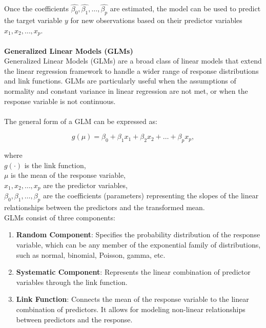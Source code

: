 \documentclass[12pt]{article}
\begin{document}
\noindent Once the coefficients \(\hat{\beta_0}, \hat{\beta_1}, \ldots, \hat{\beta_p}\) are estimated,
the model can be used to predict the target variable \(y\) for new observations based on
their predictor variables \(x_1, x_2, \ldots, x_p\).\\
\\
\textbf{Generalized Linear Models (GLMs)}\\
Generalized Linear Models (GLMs) are a broad class of linear models that extend the linear
regression framework to handle a wider range of response distributions and link functions.
GLMs are particularly useful when the assumptions of normality and constant variance in
linear regression are not met, or when the response variable is not continuous.\\
\\
The general form of a GLM can be expressed as:

\begin{equation}
    g(\mu) = \beta_0 + \beta_1 x_1 + \beta_2 x_2 + \ldots + \beta_p x_p,
\end{equation}

\noindent where\\
\( g(\cdot) \) is the link function,\\
\( \mu \) is the mean of the response variable,\\
\( x_1, x_2, \ldots, x_p \) are the predictor variables,\\
\( \beta_0, \beta_1, \ldots, \beta_p \) are the coefficients (parameters) representing the slopes of the linear relationships between the predictors and the transformed mean.\\

\noindent GLMs consist of three components: 
\begin{enumerate}
    \item \textbf{Random Component}: Specifies the probability distribution of the response variable, which can be any member of the exponential family of distributions, such as normal, binomial, Poisson, gamma, etc.
    \item \textbf{Systematic Component}: Represents the linear combination of predictor variables through the link function.
    \item \textbf{Link Function}: Connects the mean of the response variable to the linear combination of predictors. It allows for modeling non-linear relationships between predictors and the response.
\end{enumerate}
\end{document}

